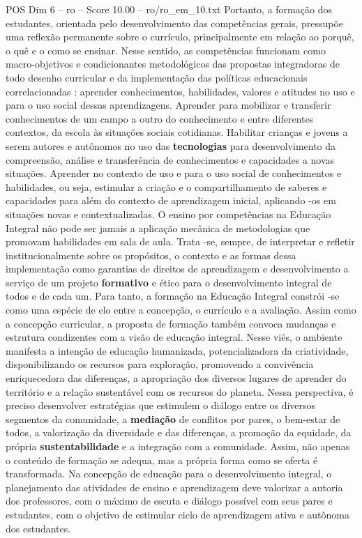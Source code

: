 \begin{textsample}{POS Dim 6 – ro – Score 10.00 – ro/ro\_em\_10.txt}
Portanto, a formação dos estudantes, orientada pelo desenvolvimento das competências gerais, pressupõe uma reflexão permanente sobre o currículo, principalmente em relação ao porquê, o quê e o como se ensinar.
Nesse sentido, as competências funcionam como macro-objetivos e condicionantes metodológicos das propostas integradoras de todo desenho curricular e da implementação das políticas educacionais correlacionadas : aprender conhecimentos, habilidades, valores e atitudes no uso e para o uso social dessas aprendizagens.
Aprender para mobilizar e transferir conhecimentos de um campo a outro do conhecimento e entre diferentes contextos, da escola às situações sociais cotidianas.
Habilitar crianças e jovens a serem autores e autônomos no uso das \textbf{tecnologias} para desenvolvimento da compreensão, análise e transferência de conhecimentos e capacidades a novas situações.
Aprender no contexto de uso e para o uso social de conhecimentos e habilidades, ou seja, estimular a criação e o compartilhamento de saberes e capacidades para além do contexto de aprendizagem inicial, aplicando -os em situações novas e contextualizadas.
O ensino por competências na Educação Integral não pode ser jamais a aplicação mecânica de metodologias que promovam habilidades em sala de aula.
Trata -se, sempre, de interpretar e refletir institucionalmente sobre os propósitos, o contexto e as formas dessa implementação como garantias de direitos de aprendizagem e desenvolvimento a serviço de um projeto \textbf{formativo} e ético para o desenvolvimento integral de todos e de cada um.
Para tanto, a formação na Educação Integral constrói -se como uma espécie de elo entre a concepção, o currículo e a avaliação.
Assim como a concepção curricular, a proposta de formação também convoca mudanças e estrutura condizentes com a visão de educação integral.
Nesse viés, o ambiente manifesta a intenção de educação humanizada, potencializadora da criatividade, disponibilizando os recursos para exploração, promovendo a convivência enriquecedora das diferenças, a apropriação dos diversos lugares de aprender do território e a relação sustentável com os recursos do planeta.
Nessa perspectiva, é preciso desenvolver estratégias que estimulem o diálogo entre os diversos segmentos da comunidade, a \textbf{mediação} de conflitos por pares, o bem-estar de todos, a valorização da diversidade e das diferenças, a promoção da equidade, da própria \textbf{sustentabilidade} e a integração com a comunidade.
Assim, não apenas o conteúdo de formação se adequa, mas a própria forma como se oferta é transformada.
Na concepção de educação para o desenvolvimento integral, o planejamento das atividades de ensino e aprendizagem deve valorizar a autoria dos professores, com o máximo de escuta e diálogo possível com seus pares e estudantes, com o objetivo de estimular ciclo de aprendizagem ativa e autônoma dos estudantes.

\end{textsample}
